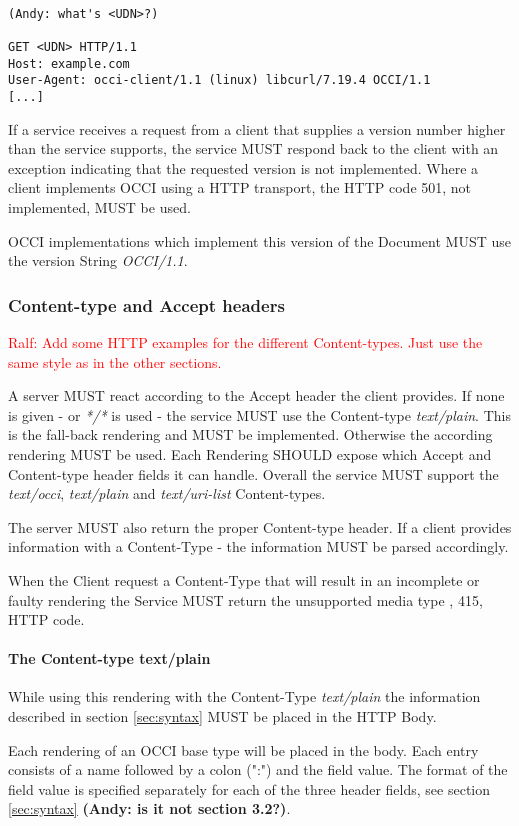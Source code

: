 \documentclass[10pt,a4paper]{article}
\newcommand{\ralf}[1]{\textcolor{red}{Ralf: #1}}
\begin{document}
\begin{verbatim}

(Andy: what's <UDN>?)

GET <UDN> HTTP/1.1
Host: example.com
User-Agent: occi-client/1.1 (linux) libcurl/7.19.4 OCCI/1.1
[...]
\end{verbatim}

If a service receives a request from a client that supplies a version
number higher than the service supports, the service MUST respond back
to the client with an exception indicating that the requested version
is not implemented. Where a client implements OCCI using a HTTP
transport, the HTTP code 501, not implemented, MUST be used.

OCCI implementations which implement this version of the Document MUST
use the version String \emph{OCCI/1.1}.

\subsubsection{Content-type and Accept headers}
\ralf{Add some HTTP examples for the different Content-types. Just use the same
style as in the other sections.}

A server MUST react according to the Accept header the client
provides. If none is given - or \textit{*/*} is used - the service MUST
use the Content-type \emph{text/plain}. This is the fall-back
rendering and MUST be implemented. Otherwise the according rendering
MUST be used. Each Rendering SHOULD expose which Accept and
Content-type header fields it can handle. Overall the service MUST
support the \textit{text/occi}, \textit{text/plain} and
\textit{text/uri-list} Content-types.

The server MUST also return the proper Content-type header. If a
client provides information with a Content-Type - the information MUST
be parsed accordingly.

When the Client request a Content-Type that will result in an
incomplete or faulty rendering the Service MUST return the unsupported media type
, 415, HTTP code.

\paragraph{The Content-type text/plain}
While using this rendering with the Content-Type \textit{text/plain}
the information described in section \ref{sec:syntax} MUST be placed
in the HTTP Body.

Each rendering of an OCCI base type will be placed in the body. Each
entry consists of a name followed by a colon (":") and the field
value. The format of the field value is specified separately for each
of the three header fields, see section \ref{sec:syntax} \textbf{(Andy: is it not section 3.2?)}.
\end{document}
